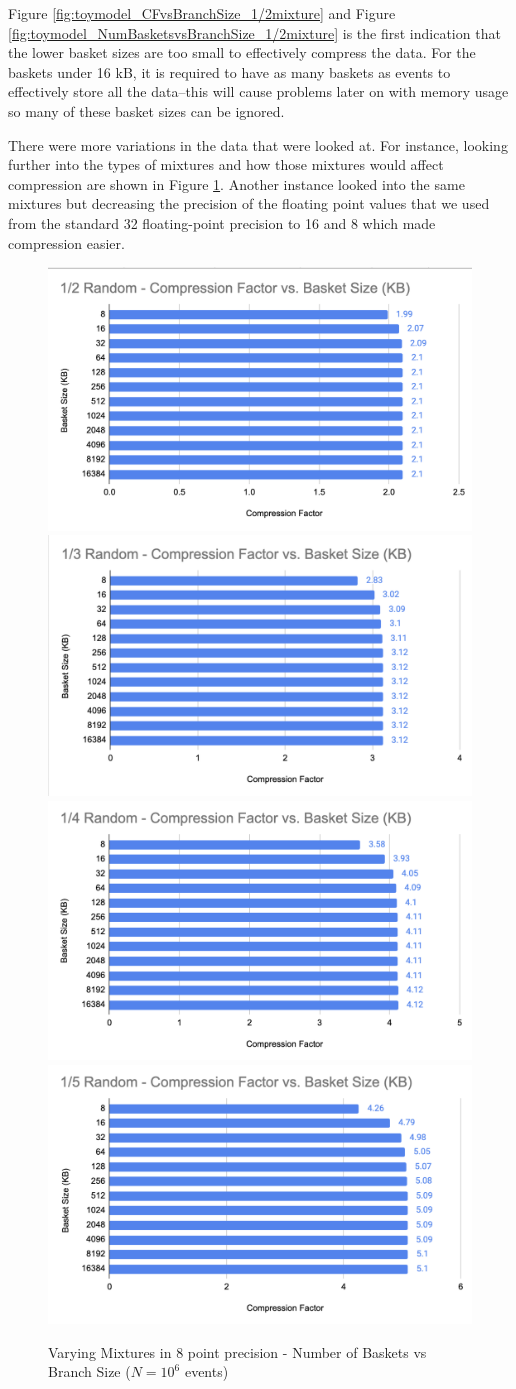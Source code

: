 Figure \ref{fig:toymodel_CFvsBranchSize_1/2mixture} and Figure \ref{fig:toymodel_NumBasketsvsBranchSize_1/2mixture} is the first indication that the lower basket sizes are too small to effectively compress the data. 
For the baskets under 16 kB, it is required to have as many baskets as events to effectively store all the data--this will cause problems later on with memory usage so many of these basket sizes can be ignored.

There were more variations in the data that were looked at. 
For instance, looking further into the types of mixtures and how those mixtures would affect compression are shown in Figure \ref{fig:toymodel_328_compF_vs_basketsize}. 
Another instance looked into the same mixtures but decreasing the precision of the floating point values that we used from the standard 32 floating-point precision to 16 and 8 which made compression easier. 

\begin{figure}[h]
    \centering
    \includegraphics[width=.5\textwidth]{content/toymodel_content/3.28/1_of_2.png}
    \includegraphics[width=.5\textwidth]{content/toymodel_content/3.28/1_of_3.png}
    \includegraphics[width=.5\textwidth]{content/toymodel_content/3.28/1_of_4.png}
    \includegraphics[width=.5\textwidth]{content/toymodel_content/3.28/1_of_5.png}
    \caption{Varying Mixtures in 8 point precision - Number of Baskets vs Branch Size ($N=10^6$ events)}
    \label{fig:toymodel_328_compF_vs_basketsize}
\end{figure}

